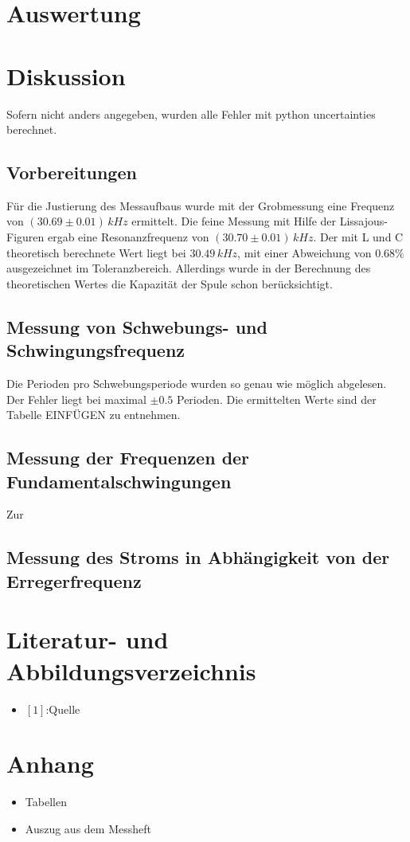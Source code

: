 \documentclass[11pt,ngerman,a4paper]{article}
\begin{document}
\section{Auswertung}

\section{Diskussion}
Sofern nicht anders angegeben, wurden alle Fehler mit python uncertainties berechnet.
\subsection{Vorbereitungen}
Für die Justierung des Messaufbaus wurde mit der Grobmessung eine Frequenz von $(30.69\pm0.01)\,kHz$ ermittelt. Die feine Messung mit Hilfe der Lissajous-Figuren ergab eine Resonanzfrequenz von $(30.70\pm0.01) \, kHz$. Der mit L und C theoretisch berechnete Wert liegt bei $30.49 \, kHz$, mit einer Abweichung von $0.68 \%$ ausgezeichnet im Toleranzbereich. Allerdings wurde in der Berechnung des theoretischen Wertes die Kapazität der Spule schon berücksichtigt.
\subsection{Messung von Schwebungs- und Schwingungsfrequenz}
Die Perioden pro Schwebungsperiode wurden so genau wie möglich abgelesen. Der Fehler liegt bei maximal $\pm 0.5$ Perioden. Die ermittelten Werte sind der Tabelle EINFÜGEN zu entnehmen.


\subsection{Messung der Frequenzen der Fundamentalschwingungen}
 Zur
\subsection{Messung des Stroms in Abhängigkeit von der Erregerfrequenz}

\section{Literatur- und Abbildungsverzeichnis}
\begin{itemize}
\item $[1]$:Quelle
\end{itemize}
\section{Anhang}
\begin{itemize}
\item Tabellen
\item Auszug aus dem Messheft


\end{itemize}

\newpage
\end{document}
